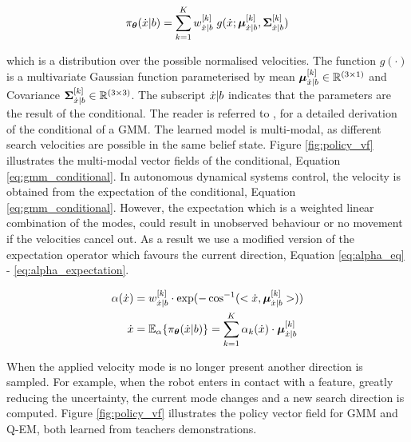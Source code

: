 \begin{equation}\label{eq:gmm_conditional}
 \pi_{\boldsymbol{\theta}}(\dot{x}|b) = \sum_{k=1}^{K} w^{[k]}_{\dot{x}|b} \; g(\dot{x};\boldsymbol{\mu}^{[k]}_{\dot{x}|b},\boldsymbol{\Sigma}^{[k]}_{\dot{x}|b}) 
 \end{equation}

which is a distribution over the possible normalised velocities. The function $g(\cdot)$ is a multivariate
Gaussian function parameterised by mean $\boldsymbol{\mu}^{[k]}_{\dot{x}|b} \in \mathbb{R}^{(3\times1)}$ and Covariance $\boldsymbol{\Sigma}^{[k]}_{\dot{x}|b} \in \mathbb{R}^{(3\times3)}$. The subscript $\dot{x}|b$ indicates that the parameters 
are the result of the conditional. The reader is referred to \cite{gesture_calinon_2010}, \cite{gmr_2004} for 
a detailed derivation of the conditional of a GMM. The learned model 
is multi-modal, as different search velocities are possible 
in the same belief state. Figure \ref{fig:policy_vf} illustrates the multi-modal 
vector fields of the conditional, Equation \ref{eq:gmm_conditional}.
In autonomous dynamical systems control, the velocity is obtained from 
the expectation of the conditional, Equation \ref{eq:gmm_conditional}. However, the expectation which is a weighted 
linear combination of the modes, could result in unobserved behaviour or no movement if the velocities cancel out. 
As a result we use a modified version of the expectation operator which favours the current
direction, Equation \ref{eq:alpha_eq} - \ref{eq:alpha_expectation}.

\begin{align}
 \alpha(\dot{x}) &= w^{[k]}_{\dot{x}|b} \cdot \exp(-\cos^{-1}(<\dot{x},\boldsymbol{\mu}^{[k]}_{\dot{x}|b}>)) \label{eq:alpha_eq}\\
 \dot{x} &= \mathbb{E}_{\alpha}\{\pi_{\boldsymbol{\theta}}(\dot{x}|b)\} = \sum_{k=1}^K \alpha_k(\dot{x}) \cdot \boldsymbol{\mu}^{[k]}_{\dot{x}|b} \label{eq:alpha_expectation}
\end{align}

When the applied velocity mode is no longer present another direction is sampled. For example, when the robot enters in contact 
with a feature, greatly reducing the uncertainty, the current mode changes and a new search direction is computed. 
Figure \ref{fig:policy_vf} illustrates the policy vector field for GMM and Q-EM, both learned from teachers demonstrations.

